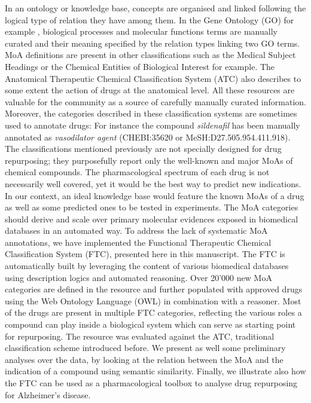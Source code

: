 \documentclass{bioinfo}
\begin{document}
In an ontology or knowledge base, concepts are organised and linked following the logical type of relation they have among them. 
In the Gene Ontology (GO) for example \citep{Ashburner2000}, biological processes and molecular functions terms are manually curated  
and their meaning specified by the relation types linking two GO terms.
MoA definitions are present in other classifications such as the Medical Subject Headings \citep{Nelson2004} or the Chemical Entities of 
Biological Interest \citep{Hastings2012} for example. The Anatomical Therapeutic 
Chemical Classification System (ATC) \citep{world2000anatomical} also describes to some 
extent the action of drugs at the anatomical level. All these resources are valuable for the community as a source of carefully 
manually curated information. Moreover, the categories described in these classification systems are sometimes used to annotate 
drugs: For instance the compound \emph{sildenafil} has been manually annotated as \emph{vasodilator agent} (CHEBI:35620 or MeSH:D27.505.954.411.918).
The classifications mentioned previously are not specially designed for drug repurposing; they purposefully report only the 
well-known and major MoAs of chemical compounds. The pharmacological spectrum of each drug is not necessarily well covered, yet 
it would be the best way to predict new indications. In our context, an ideal knowledge base would feature the known MoAs of a 
drug as well as some predicted ones to be tested in experiments. The MoA categories should derive and scale over primary molecular 
evidences exposed in biomedical databases in an automated way.
To address the lack of systematic MoA annotations, we have implemented the Functional Therapeutic Chemical 
Classification System (FTC), presented here in this manuscript. The FTC is automatically built by leveraging the content 
of various biomedical databases using description logics and automated reasoning. Over 20'000 new MoA categories are defined 
in the resource and further populated with approved drugs using the Web Ontology Language (OWL) in combination with a reasoner. 
Most of the drugs are present in multiple FTC categories, reflecting the various roles a compound can play inside a biological system which 
can serve as starting point for repurposing. 
The resource was evaluated against the ATC, traditional classification scheme introduced before. We present as well some preliminary 
analyses over the data, by looking at the relation between the MoA and the indication of a compound using semantic similarity. 
Finally, we illustrate also how the FTC can be used as a pharmacological toolbox to analyse drug repurposing for Alzheimer’s disease.
\end{document}

